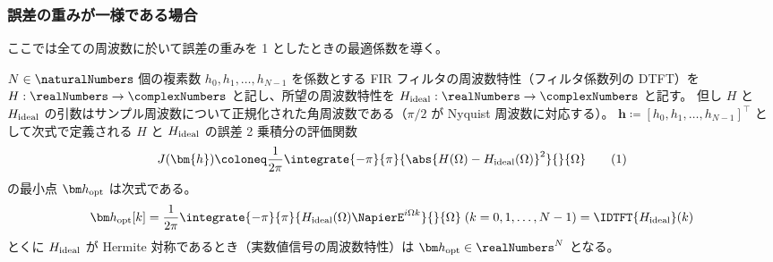         \subsubsection{誤差の重みが一様である場合}
            \label{誤差の重みが一様である場合}
            ここでは全ての周波数に於いて誤差の重みを 1 としたときの最適係数を導く。
            \begin{shadebox}
                $N\in\naturalNumbers$ 個の複素数 $h_0,h_1,\dots,h_{N-1}$ を係数とする FIR フィルタの周波数特性（フィルタ係数列の DTFT）を $H:\realNumbers\to\complexNumbers$ と記し、所望の周波数特性を $\Hideal:\realNumbers\to\complexNumbers$ と記す。
                但し $H$ と $H_\text{ideal}$ の引数はサンプル周波数について正規化された角周波数である（$\pi/2$ が Nyquist 周波数に対応する）。
                $\bm{h} \coloneq [h_0,h_1,\dots,h_{N-1}]^\top$ として次式で定義される $H$ と $H_\text{ideal}$ の誤差 2 乗積分の評価関数
                \[ J(\bm{h}) \coloneq \frac{1}{2\pi}\integrate{-\pi}{\pi}{\abs{H(\Omega)-\Hideal(\Omega)}^2}{}{\Omega} \tag{1} \]
                の最小点 $\vhOpt$ は次式である。
                \[ \vhOpt[k] = \frac{1}{2\pi}\integrate{-\pi}{\pi}{\Hideal(\Omega)\NapierE^{i\Omega k}}{}{\Omega}\;(k=0,1,\dots,N-1) = \IDTFT{\Hideal}(k) \]
                とくに $H_\text{ideal}$ が Hermite 対称であるとき（実数値信号の周波数特性）は $\vhOpt\in\realNumbers^N$ となる。
            \end{shadebox}

